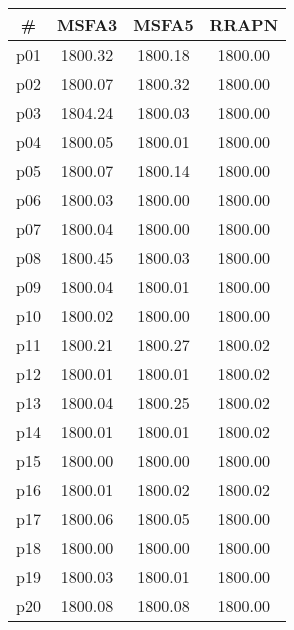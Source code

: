 \begin{tabular}{cccc}
\toprule
\textbf{\#} & \textbf{MSFA3} & \textbf{MSFA5} & \textbf{RRAPN}\\
\midrule
p01 & 1800.32 & 1800.18 & 1800.00\\
p02 & 1800.07 & 1800.32 & 1800.00\\
p03 & 1804.24 & 1800.03 & 1800.00\\
p04 & 1800.05 & 1800.01 & 1800.00\\
p05 & 1800.07 & 1800.14 & 1800.00\\
p06 & 1800.03 & 1800.00 & 1800.00\\
p07 & 1800.04 & 1800.00 & 1800.00\\
p08 & 1800.45 & 1800.03 & 1800.00\\
p09 & 1800.04 & 1800.01 & 1800.00\\
p10 & 1800.02 & 1800.00 & 1800.00\\
p11 & 1800.21 & 1800.27 & 1800.02\\
p12 & 1800.01 & 1800.01 & 1800.02\\
p13 & 1800.04 & 1800.25 & 1800.02\\
p14 & 1800.01 & 1800.01 & 1800.02\\
p15 & 1800.00 & 1800.00 & 1800.00\\
p16 & 1800.01 & 1800.02 & 1800.02\\
p17 & 1800.06 & 1800.05 & 1800.00\\
p18 & 1800.00 & 1800.00 & 1800.00\\
p19 & 1800.03 & 1800.01 & 1800.00\\
p20 & 1800.08 & 1800.08 & 1800.00\\
\bottomrule
\end{tabular}


